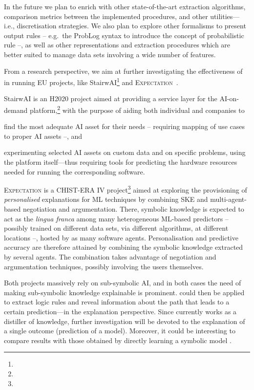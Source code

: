 \documentclass[12pt,a4paper,openright,twoside]{book}
\begin{document}
In the future we plan to enrich \psyke{} with other state-of-the-art extraction algorithms, comparison metrics between the implemented procedures, and other utilities---i.e., discretisation strategies.
%
We also plan to explore other formalisms to present output rules -- e.g.\ the ProbLog syntax to introduce the concept of probabilistic rule --, as well as other representations and extraction procedures which are better suited to manage data sets involving a wide number of features.

From a research perspective, we aim at further investigating the effectiveness of \psyke{} in running EU projects, like StairwAI\footnote{} and \textsc{Expectation}~\cite{expectation-extraamas2021}.

StairwAI is an H2020 project aimed at providing a service layer for the AI-on-demand platform,\footnote{} with the purpose of aiding both individual and companies to
%
\begin{inlinelist}
    \item find the most adequate AI asset for their needs -- requiring mapping of use cases to proper AI assets --, and
    \item experimenting selected AI assets on custom data and on specific problems, using the platform itself---thus requiring tools for predicting the hardware resources needed for running the corresponding software.
\end{inlinelist}

\textsc{Expectation} is a CHIST-ERA IV project\footnote{} aimed at exploring the provisioning of \emph{personalised} explanations for ML techniques by combining SKE and multi-agent-based negotiation and argumentation.
%
There, symbolic knowledge is expected to act as the \emph{lingua franca} among many heterogeneous ML-based predictors -- possibly trained on different data sets, via different algorithms, at different locations --, hosted by as many software agents.
%
Personalisation and predictive accuracy are therefore attained by combining the symbolic knowledge extracted by several agents.
%
The combination takes advantage of negotiation and argumentation techniques, possibly involving the users themselves.

Both projects massively rely on sub-symbolic AI, and in both cases the need of making sub-symbolic knowledge explainable is prominent.
%
\psyke{} could then be applied to extract logic rules and reveal information about the path that leads to a certain prediction---in the explanation perspective.
%
Since \psyke{} currently works as a distiller of knowledge, further investigation will be devoted to the explanation of a single outcome (prediction of a model).
%
Moreover, it could be interesting to compare results with those obtained by directly learning a symbolic model .
\end{document}
